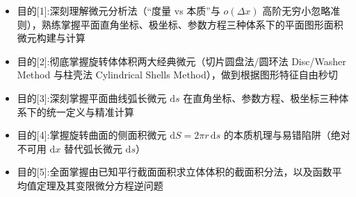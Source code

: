\documentclass[11pt,a4paper,UTF8]{ctexart}
\begin{document}
\pagestyle{fancy}
\fancyhf{}
\fancyhead[R]{\small\color{TitlePurple}\nouppercase{\leftmark}}
\renewcommand{\headrulewidth}{0.5pt}

\tableofcontents
\newpage
{}


\begin{targetbox}[本章复习目标与核心知识图谱]
\begin{itemize}
  \item 目的[1]:深刻理解微元分析法（“度量 vs 本质”与 $o(\Delta x)$ 高阶无穷小忽略准则），熟练掌握平面直角坐标、极坐标、参数方程三种体系下的平面图形面积微元构建与计算
\end{itemize}
\end{targetbox}

\begin{targetbox}[本章复习目标与核心知识图谱]
\begin{itemize}
  \item 目的[2]:彻底掌握旋转体体积两大经典微元（切片圆盘法/圆环法 Disc/Washer Method 与柱壳法 Cylindrical Shells Method），做到根据图形特征自由秒切
\end{itemize}
\end{targetbox}

\begin{targetbox}[本章复习目标与核心知识图谱]
\begin{itemize}
  \item 目的[3]:深刻掌握平面曲线弧长微元 $\mathrm{d}s$ 在直角坐标、参数方程、极坐标三种体系下的统一定义与精准计算
\end{itemize}
\end{targetbox}

\begin{targetbox}[本章复习目标与核心知识图谱]
\begin{itemize}
  \item 目的[4]:掌握旋转曲面的侧面积微元 $\mathrm{d}S = 2\pi r\,\mathrm{d}s$ 的本质机理与易错陷阱（绝对不可用 $\mathrm{d}x$ 替代弧长微元 $\mathrm{d}s$）
\end{itemize}
\end{targetbox}

\begin{targetbox}[本章复习目标与核心知识图谱]
\begin{itemize}
  \item 目的[5]:全面掌握由已知平行截面面积求立体体积的截面积分法，以及函数平均值定理及其变限微分方程逆问题
\end{itemize}
\end{targetbox}
\end{document}
